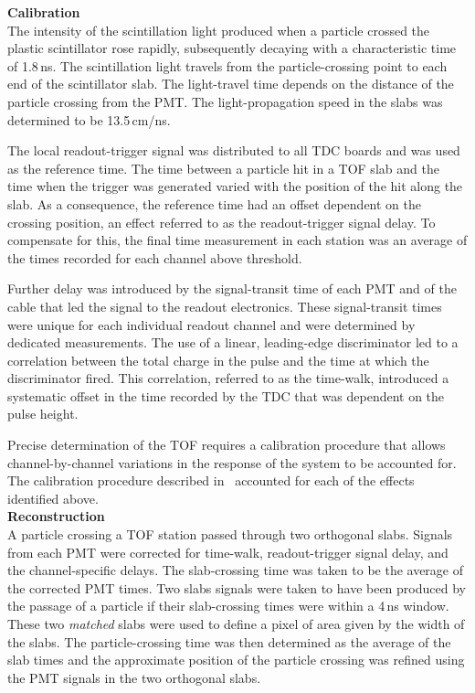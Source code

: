 \noindent\textbf{Calibration} \\
\noindent
The intensity of the scintillation light produced when a particle
crossed the plastic scintillator rose rapidly, subsequently decaying
with a characteristic time of 1.8\,ns. 
The scintillation light travels from the particle-crossing point to
each end of the scintillator slab.
The light-travel time depends on the distance of the particle
crossing from the PMT.
The light-propagation speed in the slabs was determined to be 13.5\,cm/ns.

The local readout-trigger signal was distributed to all TDC boards and was
used as the reference time.
The time between a particle hit in a TOF slab and the time when the
trigger was generated varied with the position of the hit along the slab.
As a consequence, the reference time had an offset dependent on
the crossing position, an effect referred to as the
readout-trigger signal delay.
To compensate for this, the final time measurement in each station was
an average of the times recorded for each channel above
threshold.

Further delay was introduced by the signal-transit time of each PMT
and of the cable that led the signal to the readout electronics.
These signal-transit times were unique for each individual readout
channel and were determined by dedicated measurements.
The use of a linear, leading-edge discriminator led to a correlation
between the total charge in the pulse and the time at which the
discriminator fired.
This correlation, referred to as the time-walk, introduced a
systematic offset in the time recorded by the TDC that was dependent on the pulse
height. 

Precise determination of the TOF requires a calibration procedure that
allows channel-by-channel variations in the response of the system to
be accounted for.
The calibration procedure described in~\cite{NOTE251} accounted for
each of the effects identified above. \\

\noindent\textbf{Reconstruction} \\
\noindent
A particle crossing a TOF station passed through two orthogonal
slabs.
Signals from each PMT were corrected for time-walk, readout-trigger
signal delay, and the channel-specific delays.
The slab-crossing time was taken to be the average of the corrected
PMT times.
Two slabs signals were taken to have been produced by the passage of a
particle if their slab-crossing times were within a 4\,ns window.
These two \textit{matched} slabs were used to define a pixel of area given by the
width of the slabs.
The particle-crossing time was then determined as the average of the
slab times and the approximate position of the particle crossing was
refined using the PMT signals in the two orthogonal slabs. \\

